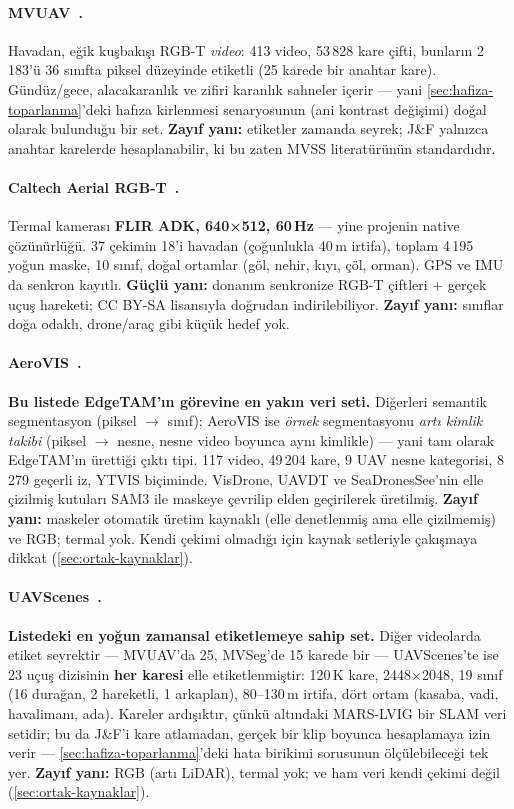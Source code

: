 \paragraph{MVUAV~\cite{ji2024mvuav}.}
Havadan, eğik kuşbakışı RGB-T \emph{video}: 413 video, 53\,828 kare
çifti, bunların 2\,183'ü 36 sınıfta piksel düzeyinde etiketli (25
karede bir anahtar kare). Gündüz/gece, alacakaranlık ve zifiri karanlık
sahneler içerir --- yani \cref{sec:hafiza-toparlanma}'deki hafıza
kirlenmesi senaryosunun (ani kontrast değişimi) doğal olarak bulunduğu
bir set. \textbf{Zayıf yanı:} etiketler zamanda seyrek; J\&F yalnızca
anahtar karelerde hesaplanabilir, ki bu zaten MVSS literatürünün
standardıdır.

\paragraph{Caltech Aerial RGB-T~\cite{lee2024caltechrgbt}.}
Termal kamerası \textbf{FLIR ADK, 640×512, 60\,Hz} --- yine projenin
native çözünürlüğü. 37 çekimin 18'i havadan (çoğunlukla 40\,m irtifa),
toplam 4\,195 yoğun maske, 10 sınıf, doğal ortamlar (göl, nehir, kıyı,
çöl, orman). GPS ve IMU da senkron kayıtlı. \textbf{Güçlü yanı:} donanım
senkronize RGB-T çiftleri + gerçek uçuş hareketi; CC BY-SA lisansıyla
doğrudan indirilebiliyor. \textbf{Zayıf yanı:} sınıflar doğa odaklı,
drone/araç gibi küçük hedef yok.

\paragraph{AeroVIS~\cite{aerovis2026}.}
\textbf{Bu listede EdgeTAM'ın görevine en yakın veri seti.} Diğerleri
semantik segmentasyon (piksel $\rightarrow$ sınıf); AeroVIS ise
\emph{örnek} segmentasyonu \emph{artı kimlik takibi} (piksel
$\rightarrow$ nesne, nesne video boyunca aynı kimlikle) --- yani tam
olarak EdgeTAM'ın ürettiği çıktı tipi. 117 video, 49\,204 kare, 9 UAV
nesne kategorisi, 8\,279 geçerli iz, YTVIS biçiminde. VisDrone, UAVDT ve
SeaDronesSee'nin elle çizilmiş kutuları SAM3 ile maskeye çevrilip elden
geçirilerek üretilmiş. \textbf{Zayıf yanı:} maskeler otomatik üretim
kaynaklı (elle denetlenmiş ama elle çizilmemiş) ve RGB; termal yok.
Kendi çekimi olmadığı için kaynak setleriyle çakışmaya dikkat
(\cref{sec:ortak-kaynaklar}).

\paragraph{UAVScenes~\cite{wang2025uavscenes}.}
\textbf{Listedeki en yoğun zamansal etiketlemeye sahip set.} Diğer
videolarda etiket seyrektir --- MVUAV'da 25, MVSeg'de 15 karede bir ---
UAVScenes'te ise 23 uçuş dizisinin \textbf{her karesi} elle
etiketlenmiştir: 120\,K kare, 2448×2048, 19 sınıf (16 durağan, 2
hareketli, 1 arkaplan), 80--130\,m irtifa, dört ortam (kasaba, vadi,
havalimanı, ada). Kareler ardışıktır, çünkü altındaki MARS-LVIG bir SLAM
veri setidir; bu da J\&F'i kare atlamadan, gerçek bir klip boyunca
hesaplamaya izin verir --- \cref{sec:hafiza-toparlanma}'deki hata
birikimi sorusunun ölçülebileceği tek yer. \textbf{Zayıf yanı:} RGB
(artı LiDAR), termal yok; ve ham veri kendi çekimi değil
(\cref{sec:ortak-kaynaklar}).

